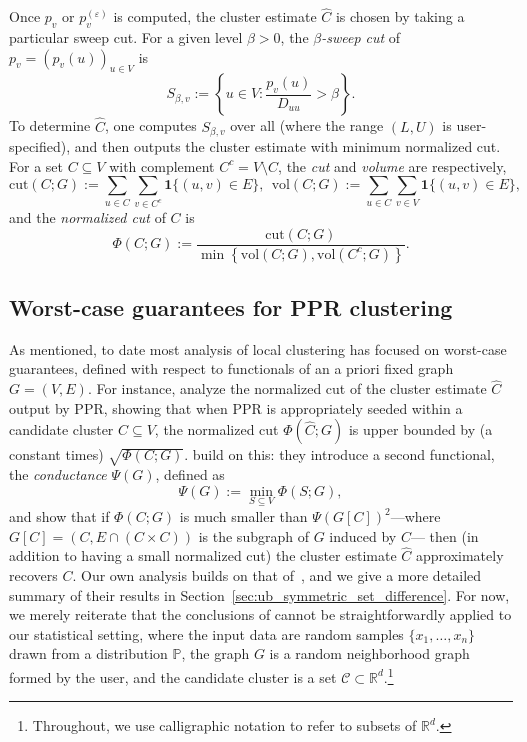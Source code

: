 \documentclass[11pt,twoside]{article}
\theoremstyle{definition}
\newcommand{\Reals}{\mathbb{R}}
\newcommand{\set}[1]{\left\{#1\right\}}
\newcommand{\1}{\mathbf{1}}
\newcommand{\Rd}{\Reals^d}
\newcommand{\mc}[1]{\mathcal{#1}}
\newcommand{\wh}[1]{\widehat{#1}}
\newcommand{\vol}{\mathrm{vol}}
\newcommand{\cut}{\mathrm{cut}}
\begin{document}
Once $p_v$ or $p_v^{(\varepsilon)}$ is computed, the cluster estimate $\wh{C}$ is chosen by taking a particular sweep cut. For a given level $\beta > 0$, the \emph{$\beta$-sweep cut} of $p_v = (p_v(u))_{u \in V}$ is 
\begin{equation}
\label{eqn:sweep_cuts}
S_{\beta,v} := \set{u \in V: \frac{p_v(u)}{D_{uu}} > \beta}.
\end{equation}
To determine $\wh{C}$, one computes $S_{\beta,v}$ over all  (where the range $(L,U)$ is user-specified), and then outputs the cluster estimate
\smash{$\wh{C} = S_{\beta^*,v}$} with minimum normalized cut. For a set $C \subseteq V$ with complement $C^c = V \!\setminus\! C$, the \emph{cut} and \emph{volume} are respectively,
\begin{equation}
\label{eqn:cut_volume}
\cut(C;G) := \sum_{u \in C} \sum_{v \in C^c}
\1\{(u,v) \in E\},~~ \vol(C; G) := \sum_{u \in C}  \sum_{v \in V} \1\{(u,v) \in E\},
\end{equation}
and the \emph{normalized cut} of $C$ is
\begin{equation}
\label{eqn:normalized_cut}
\Phi(C; G) := \frac{\cut(C;G)}{\min \set{\vol(C; G), \vol(C^c; G)}}.
\end{equation} 

\subsection{Worst-case guarantees for PPR clustering}
As mentioned, to date most analysis of local clustering has focused on worst-case guarantees, defined with respect to functionals of an a priori fixed graph $G = (V,E)$.  For instance, \cite{andersen2006} analyze the normalized cut of the cluster estimate $\wh{C}$ output by PPR, showing that when PPR is appropriately seeded within a candidate cluster $C \subseteq V$, the normalized cut $\Phi(\wh{C};G)$ is upper bounded by (a constant times)  $\sqrt{\Phi(C;G)}$. \cite{zhu2013} build on this: they introduce a second functional, the \emph{conductance} $\Psi(G)$, defined as 
\begin{equation}
\label{eqn:conductance}
\Psi(G) := \min_{S \subseteq V} \Phi(S;G),
\end{equation}
and show that if $\Phi(C;G)$ is much smaller than $\Psi(G[C])^2$---where $G[C] = (C,E \cap (C \times C))$ is the subgraph of $G$ induced by $C$--- then (in addition to having a small normalized cut) the cluster estimate $\wh{C}$ approximately recovers $C$. Our own analysis builds on that of~\cite{zhu2013}, and we give a more detailed summary of their results in Section~\ref{sec:ub_symmetric_set_difference}.
For now, we merely reiterate that the conclusions of \citet{andersen2006,zhu2013} cannot be straightforwardly applied to our statistical setting, where the input data are random samples $\{x_1,\ldots,x_n\}$ drawn from a distribution $\mathbb{P}$, the graph $G$ is a random neighborhood graph formed by the user, and the candidate cluster is a set $\mc{C} \subset \Rd$.\footnote{Throughout, we use calligraphic notation to refer to subsets of $\Rd$.}
\end{document}
